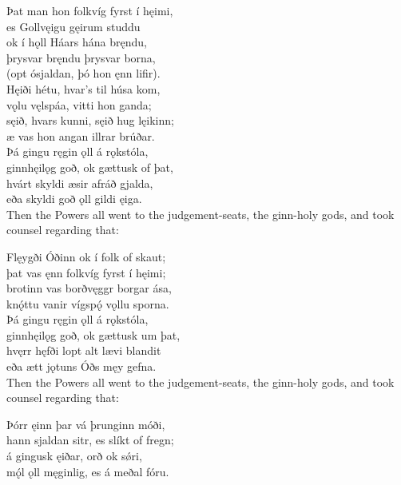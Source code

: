 \bva Þat man hon folkvíg \hld fyrst í hęimi, \\%
es Gollvęigu \hld gęirum studdu \\%
ok í hǫll Háars \hld hána bręndu, \\%
þrysvar bręndu \hld þrysvar borna, \\%
(opt ósjaldan, \hld þó hon ęnn lifir).\\%

\bva Hęiði hétu, \hld hvar's til húsa kom, \\%
vǫlu vęlspáa, \hld vitti hon ganda; \\%
sęið, hvars kunni, \hld sęið hug lęikinn; \\%
æ vas hon angan \hld illrar brúðar.\\%

\bva Þá gingu ręgin ǫll \hld á rǫkstóla, \\%
ginnhęilǫg goð, \hld ok gættusk of þat, \\%
hvárt skyldi æsir \hld afráð gjalda, \\%
eða skyldi goð ǫll \hld gildi ęiga.\\%

\bvb Then the Powers all went to the judgement-seats, the ginn-holy gods, and took counsel regarding that:

\bva Flęygði Óðinn \hld ok í folk of skaut; \\%
þat vas ęnn folkvíg \hld fyrst í hęimi; \\%
brotinn vas borðvęggr \hld borgar ása, \\%
knǫ́ttu vanir vígspǫ́ \hld vǫllu sporna.\\%

\bva Þá gingu ręgin ǫll \hld á rǫkstóla, \\%
ginnhęilǫg goð, \hld ok gættusk um þat, \\%
hvęrr hęfði lopt alt \hld lævi blandit \\%
eða ætt jǫtuns \hld Óðs męy gefna.\\%

\bvb Then the Powers all went to the judgement-seats, the ginn-holy gods, and took counsel regarding that:

\bva Þórr ęinn þar vá \hld þrunginn móði, \\%
hann sjaldan sitr, \hld es slíkt of fregn; \\%
á gingusk ęiðar, \hld orð ok sǿri, \\%
mǫ́l ǫll męginlig, \hld es á meðal fóru.\\%

